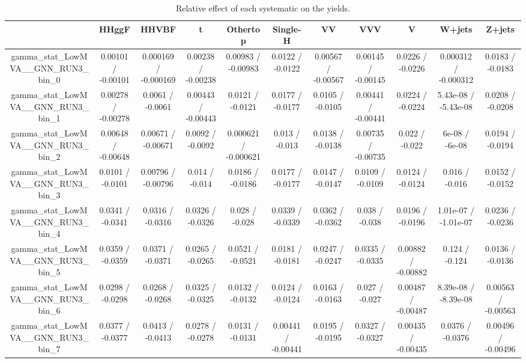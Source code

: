 \documentclass[10pt]{article}
\begin{document}
\begin{table}[htbp]
\begin{center}
\begin{tabular}{|c|c|c|c|c|c|c|c|c|c|c|}
\hline 
      & HHggF      & HHVBF      & t      & Othertop      & Single-H      & VV      & VVV      & V      & W+jets      & Z+jets \\ 
\hline 
  gamma_stat_LowMVA__GNN_RUN3_bin_0 & 0.00101 / -0.00101 & 0.000169 / -0.000169 & 0.00238 / -0.00238 & 0.00983 / -0.00983 & 0.0122 / -0.0122 & 0.00567 / -0.00567 & 0.00145 / -0.00145 & 0.0226 / -0.0226 & 0.000312 / -0.000312 & 0.0183 / -0.0183 \\ 
  gamma_stat_LowMVA__GNN_RUN3_bin_1 & 0.00278 / -0.00278 & 0.0061 / -0.0061 & 0.00443 / -0.00443 & 0.0121 / -0.0121 & 0.0177 / -0.0177 & 0.0105 / -0.0105 & 0.00441 / -0.00441 & 0.0224 / -0.0224 & 5.43e-08 / -5.43e-08 & 0.0208 / -0.0208 \\ 
  gamma_stat_LowMVA__GNN_RUN3_bin_2 & 0.00648 / -0.00648 & 0.00671 / -0.00671 & 0.0092 / -0.0092 & 0.000621 / -0.000621 & 0.013 / -0.013 & 0.0138 / -0.0138 & 0.00735 / -0.00735 & 0.022 / -0.022 & 6e-08 / -6e-08 & 0.0194 / -0.0194 \\ 
  gamma_stat_LowMVA__GNN_RUN3_bin_3 & 0.0101 / -0.0101 & 0.00796 / -0.00796 & 0.014 / -0.014 & 0.0186 / -0.0186 & 0.0177 / -0.0177 & 0.0147 / -0.0147 & 0.0109 / -0.0109 & 0.0124 / -0.0124 & 0.016 / -0.016 & 0.0152 / -0.0152 \\ 
  gamma_stat_LowMVA__GNN_RUN3_bin_4 & 0.0341 / -0.0341 & 0.0316 / -0.0316 & 0.0326 / -0.0326 & 0.028 / -0.028 & 0.0339 / -0.0339 & 0.0362 / -0.0362 & 0.038 / -0.038 & 0.0196 / -0.0196 & 1.01e-07 / -1.01e-07 & 0.0236 / -0.0236 \\ 
  gamma_stat_LowMVA__GNN_RUN3_bin_5 & 0.0359 / -0.0359 & 0.0371 / -0.0371 & 0.0265 / -0.0265 & 0.0521 / -0.0521 & 0.0181 / -0.0181 & 0.0247 / -0.0247 & 0.0335 / -0.0335 & 0.00882 / -0.00882 & 0.124 / -0.124 & 0.0136 / -0.0136 \\ 
  gamma_stat_LowMVA__GNN_RUN3_bin_6 & 0.0298 / -0.0298 & 0.0268 / -0.0268 & 0.0325 / -0.0325 & 0.0132 / -0.0132 & 0.0124 / -0.0124 & 0.0163 / -0.0163 & 0.027 / -0.027 & 0.00487 / -0.00487 & 8.39e-08 / -8.39e-08 & 0.00563 / -0.00563 \\ 
  gamma_stat_LowMVA__GNN_RUN3_bin_7 & 0.0377 / -0.0377 & 0.0413 / -0.0413 & 0.0278 / -0.0278 & 0.0131 / -0.0131 & 0.00441 / -0.00441 & 0.0195 / -0.0195 & 0.0327 / -0.0327 & 0.00435 / -0.00435 & 0.0376 / -0.0376 & 0.00496 / -0.00496 \\ 
\hline 
\end{tabular} 
\caption{Relative effect of each systematic on the yields.} 
\end{center} 
\end{table} 
\end{document}
